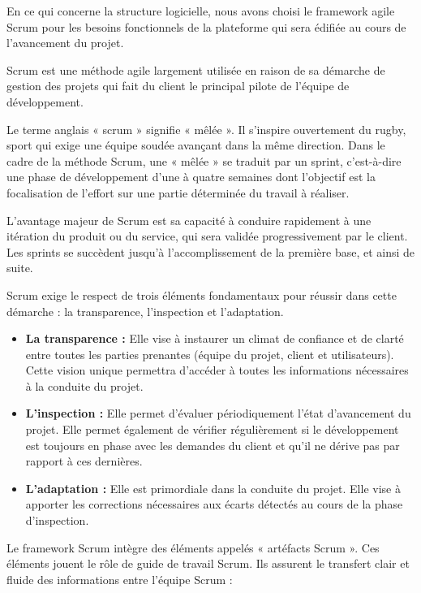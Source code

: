 \documentclass[a4paper,12pt]{report}
\begin{document}
En ce qui concerne la structure logicielle, nous avons choisi le framework agile Scrum pour les besoins fonctionnels de la plateforme qui sera édifiée au cours de l'avancement du projet\cite{scrumguide}.

Scrum est une méthode agile largement utilisée en raison de sa démarche de gestion des projets qui fait du client le principal pilote de l'équipe de développement\cite{scrumguide}.

Le terme anglais « scrum » signifie « mêlée ». Il s'inspire ouvertement du rugby, sport qui exige une équipe soudée avançant dans la même direction. Dans le cadre de la méthode Scrum, une « mêlée » se traduit par un sprint, c'est-à-dire une phase de développement d'une à quatre semaines dont l'objectif est la focalisation de l'effort sur une partie déterminée du travail à réaliser.

L'avantage majeur de Scrum est sa capacité à conduire rapidement à une itération du produit ou du service, qui sera validée progressivement par le client. Les sprints se succèdent jusqu'à l'accomplissement de la première base, et ainsi de suite.

Scrum exige le respect de trois éléments fondamentaux pour réussir dans cette démarche : la transparence, l'inspection et l'adaptation.

\begin{itemize}
\item \textbf{La transparence :} Elle vise à instaurer un climat de confiance et de clarté entre toutes les parties prenantes (équipe du projet, client et utilisateurs). Cette vision unique permettra d'accéder à toutes les informations nécessaires à la conduite du projet.

\item \textbf{L'inspection :} Elle permet d'évaluer périodiquement l'état d'avancement du projet. Elle permet également de vérifier régulièrement si le développement est toujours en phase avec les demandes du client et qu'il ne dérive pas par rapport à ces dernières.

\item \textbf{L'adaptation :} Elle est primordiale dans la conduite du projet. Elle vise à apporter les corrections nécessaires aux écarts détectés au cours de la phase d'inspection.
\end{itemize}

Le framework Scrum intègre des éléments appelés « artéfacts Scrum ». Ces éléments jouent le rôle de guide de travail Scrum. Ils assurent le transfert clair et fluide des informations entre l'équipe Scrum :
\end{document}
